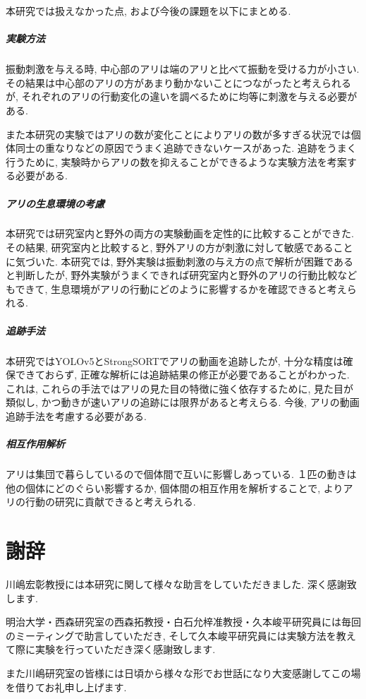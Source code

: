 ﻿\documentclass[a4paper, 12pt]{jsreport}
\begin{document}
本研究では扱えなかった点, および今後の課題を以下にまとめる. 
\paragraph{実験方法}振動刺激を与える時,  中心部のアリは端のアリと比べて振動を受ける力が小さい. その結果は中心部のアリの方があまり動かないことにつながったと考えられるが, それぞれのアリの行動変化の違いを調べるために均等に刺激を与える必要がある. 

また本研究の実験ではアリの数が変化ことによりアリの数が多すぎる状況では個体同士の重なりなどの原因でうまく追跡できないケースがあった. 追跡をうまく行うために,  実験時からアリの数を抑えることができるような実験方法を考案する必要がある. 

\paragraph{アリの生息環境の考慮}
本研究では研究室内と野外の両方の実験動画を定性的に比較することができた. その結果,  研究室内と比較すると, 野外アリの方が刺激に対して敏感であることに気づいた. 本研究では,  野外実験は振動刺激の与え方の点で解析が困難であると判断したが,  野外実験がうまくできれば研究室内と野外のアリの行動比較などもできて,  生息環境がアリの行動にどのように影響するかを確認できると考えられる. 
\paragraph{追跡手法}本研究ではYOLOv5とStrongSORTでアリの動画を追跡したが, 十分な精度は確保できておらず,  正確な解析には追跡結果の修正が必要であることがわかった. これは,  これらの手法ではアリの見た目の特徴に強く依存するために,  見た目が類似し,  かつ動きが速いアリの追跡には限界があると考えらる. 今後,  アリの動画追跡手法を考慮する必要がある. 
\paragraph{相互作用解析}アリは集団で暮らしているので個体間で互いに影響しあっている. １匹の動きは他の個体にどのぐらい影響するか,  個体間の相互作用を解析することで,  よりアリの行動の研究に貢献できると考えられる. 

\chapter*{謝辞}

川嶋宏彰教授には本研究に関して様々な助言をしていただきました. 深く感謝致します. 

明治大学・西森研究室の西森拓教授・白石允梓准教授・久本峻平研究員には毎回のミーティングで助言していただき, そして久本峻平研究員には実験方法を教えて際に実験を行っていただき深く感謝致します. 

また川嶋研究室の皆様には日頃から様々な形でお世話になり大変感謝してこの場を借りてお礼申し上げます. 



\end{document}
